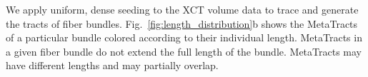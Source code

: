 We apply uniform, dense seeding to the XCT volume data to trace and generate the tracts of fiber bundles. Fig.~\ref{fig:length_distribution}b shows the MetaTracts of a particular bundle colored according to their individual length.
%
MetaTracts in a given fiber bundle do not extend the full length of the bundle. MetaTracts may have different lengths and may partially overlap.
 
 
%
 


